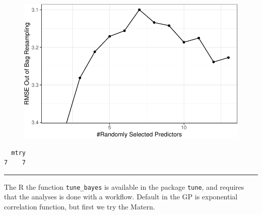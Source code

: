 \documentclass[
  letterpaper,
  DIV=11,
  numbers=noendperiod]{scrartcl}
\newenvironment{Shaded}{\begin{snugshade}}{\end{snugshade}}
\newcommand{\NormalTok}[1]{\textcolor[rgb]{0.00,0.23,0.31}{#1}}
\newcommand{\SpecialCharTok}[1]{\textcolor[rgb]{0.37,0.37,0.37}{#1}}
\begin{document}
\begin{figure}[H]

{\centering \includegraphics{L16_files/figure-pdf/unnamed-chunk-2-1.pdf}

}

\end{figure}

\begin{Shaded}
\end{Shaded}

\begin{verbatim}
  mtry
7    7
\end{verbatim}

\begin{center}\rule{0.5\linewidth}{0.5pt}\end{center}

The R the function \texttt{tune\_bayes} is available in the package
\texttt{tune}, and requires that the analyses is done with a workflow.
Default in the GP is exponential correlation function, but first we try
the Matern.
\end{document}
